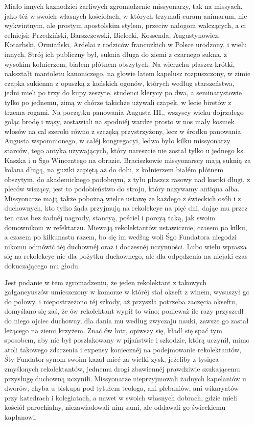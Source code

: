 \documentclass{book}
\begin{document}
Miało innych kaznodziei żarliwych zgromadzenie missyonarzy, tak na missyach, jako téż w swoich własnych kościołach, w których trzymali curam animarum, nie wykwintnym, ale prostym apostolskim stylem, przeciw nałogom walczących, a ci celniejsi: Przedziński, Barszczewski, Bielecki, Kossenda, Augustynowicz, Kotarbski, Ormiański, Ardelai z rodziców francuzkich w Polsce urodzony, i wielu innych. Strój ich publiczny był, suknia długa do ziemi z czarnego sukna, z wysokim kołnierzem, białem płótnem obszytych. Na wierzchu płaszcz krótki, nakształt mantoletu kanoniczego, na głowie latem kapelusz rozpuszczony, w zimie czapka sukienna z opuszką z końskich ogonów, których według starszeństwa, jedni mieli po trzy do kupy zeszyte, studenci klerycy po dwa, a seminarystowie tylko po jednemu, zimą w chórze takichże używali czapek, w lecie biretów z trzema rogami. Na początku panowania Augusta III., wszyscy wieku dojrzałego goląc brodę i wąsy, zostawiali na spodniéj wardze prosto w nos mały kosmek włosów na cal szeroki równo z szczęką przystrzyżony, lecz w środku panowania Augusta wspomnionego, w całéj kongregacyi, ledwo było kilku missyonarzy starców, tego antyka używających, który nareszcie nie został tylko u jednego ks. Kaszka i u Śgo Wincentego na obrazie. Braciszkowie missyonarscy mają suknią za kolana długą, na guziki zapiętą aż do dołu, z kołnierzem białém płótnem obszytym, do akademickiego podobnym, z tyłu płaszcz rasowy nad kostki długi, z pleców wiszący, jest to podobieństwo do stroju, który nazywamy antiqua alba. Missyonarze mają także pobożną wielce ustawę że każdego z świeckich osób i z duchownych, kto tylko żąda przyjmują na rekolekcye na pięć dni, dając mu przez ten czas bez żadnéj nagrody, stancyą, pościel i porcyą taką, jak swoim domownikom w refektarzu. Miewają rekolektantów ustawicznie, czasem po kilku, a czasem po kilkunastu razem, bo się im według woli Śgo Fundatora niegodzi nikomu odmówić téj duchownéj oraz i doczesnéj uczynności. Lubo wielu wprasza się na rekolekcye nie dla pożytku duchownego, ale dla odpędzenia na niejaki czas dokuczającego mu głodu.

Jest podanie w tem zgromadzeniu, że jeden rekolektant z takowych gałgancyuszów umieszczony w komorze w któréj stał okseft z winem, wysuszył go do połowy, i niepostrzeżono téj szkody, aż przyszła potrzeba zaczęcia okseftu, domyślano się zaś, że ów rekolektant wypił to wino; ponieważ ile razy przyszedł do niego ojciec duchowny, dla dania mu według zwyczaju nauki, zawsze go zastał leżącego na ziemi krzyżem. Znać ów łotr, opiwszy się, kładł się spać tym sposobem, aby nie był poszlakowany w pijaństwie i szkodzie, którą uczynił, mimo atoli takowego zdarzenia i expensy koniecznéj na podejmowanie rekolektantów, Śty Fundator synom swoim kazał mieć za wielki zysk, jeżeliby z tysiąca zmyślonych rekolektantów, jednemu drogi zbawiennéj prawdziwie szukającemu przysługę duchowną uczynili. Missyonarze nieprzyjmowali żadnych kapelaniów u dworów, chyba u biskupa pod tytułem teologa, ani plebaniów, ani wikaryatów przy katedrach i kolegiatach, a nawet w swoich własnych dobrach, gdzie mieli kościół parochialny, niezawiadowali nim sami, ale oddawali go świeckiemu kapłanowi.
\end{document}
